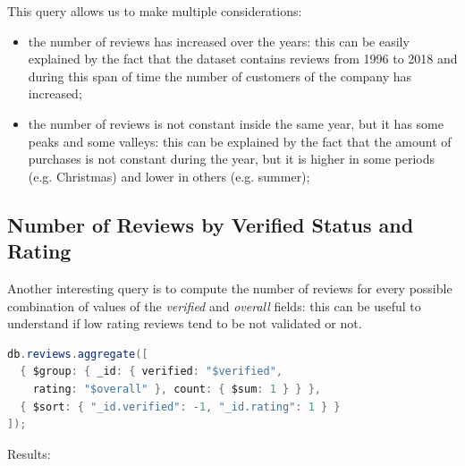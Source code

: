 \newpage
This query allows us to make multiple considerations:
\begin{itemize}
    \item the number of reviews has increased over the years: this can be easily explained by the fact that the dataset contains reviews from 1996 to 2018 and during this span of time the number of customers of the company has increased;
    \item the number of reviews is not constant inside the same year, but it has some peaks and some valleys: this can be explained by the fact that the amount of purchases is not constant during the year, but it is higher in some periods (e.g. Christmas) and lower in others (e.g. summer);
\end{itemize}

\newpage
\subsection{Number of Reviews by Verified Status and Rating}
Another interesting query is to compute the number of reviews for every possible combination of values of the \textit{verified} and \textit{overall} fields: this can be useful to understand if low rating reviews tend to be not validated or not. \\
\begin{lstlisting}[language=Java]
db.reviews.aggregate([
  { $group: { _id: { verified: "$verified", 
    rating: "$overall" }, count: { $sum: 1 } } },
  { $sort: { "_id.verified": -1, "_id.rating": 1 } }
]);
\end{lstlisting}
Results:
